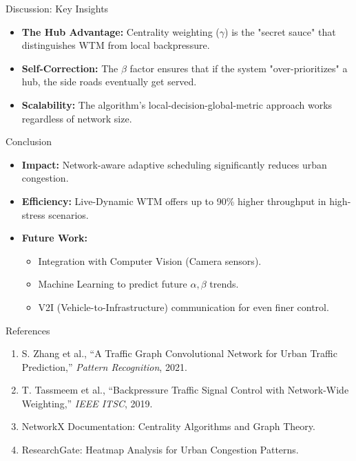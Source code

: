 \documentclass{beamer}
\begin{document}
\begin{frame}{Discussion: Key Insights}
    \begin{itemize}
        \item \textbf{The Hub Advantage:} Centrality weighting ($\gamma$) is the "secret sauce" that distinguishes WTM from local backpressure. \pause
        \item \textbf{Self-Correction:} The $\beta$ factor ensures that if the system "over-prioritizes" a hub, the side roads eventually get served. \pause
        \item \textbf{Scalability:} The algorithm's local-decision-global-metric approach works regardless of network size.
    \end{itemize}
\end{frame}

\begin{frame}{Conclusion}
    \begin{itemize}
        \item \textbf{Impact:} Network-aware adaptive scheduling significantly reduces urban congestion. \pause
        \item \textbf{Efficiency:} Live-Dynamic WTM offers up to 90\% higher throughput in high-stress scenarios. \pause
        \item \textbf{Future Work:}
            \begin{itemize}
                \item Integration with Computer Vision (Camera sensors).
                \item Machine Learning to predict future $\alpha, \beta$ trends.
                \item V2I (Vehicle-to-Infrastructure) communication for even finer control.
            \end{itemize}
    \end{itemize}
\end{frame}

\begin{frame}{References}
    \begin{enumerate}
        \item \footnotesize S. Zhang et al., ``A Traffic Graph Convolutional Network for Urban Traffic Prediction,'' \textit{Pattern Recognition}, 2021.
        \item \footnotesize T. Tassmeem et al., ``Backpressure Traffic Signal Control with Network-Wide Weighting,'' \textit{IEEE ITSC}, 2019.
        \item \footnotesize NetworkX Documentation: Centrality Algorithms and Graph Theory.
        \item \footnotesize ResearchGate: Heatmap Analysis for Urban Congestion Patterns.
    \end{enumerate}
\end{frame}
\end{document}
